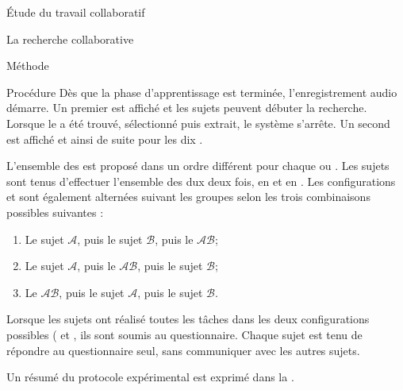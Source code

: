 \documentclass[myfrancais]{mythesis}
\begin{document}
\begin{mypart}{Étude du travail collaboratif}
\begin{mychapter}{La recherche collaborative}
\begin{mysection}{Méthode}
\begin{mysubsection}{Procédure}
					Dès que la phase d'apprentissage est terminée, l'enregistrement audio démarre.
					Un premier  est affiché et les sujets peuvent débuter la recherche.
					Lorsque le  a été trouvé, sélectionné puis extrait, le système s'arrête.
					Un second  est affiché et ainsi de suite pour les dix .

					L'ensemble des  est proposé dans un ordre différent pour chaque  ou .
					Les sujets sont tenus d'effectuer l'ensemble des dux  deux fois, en  et en .
					Les configurations  et  sont également alternées suivant les groupes selon les trois combinaisons possibles suivantes :
					\begin{enumerate}
						\item Le sujet $\mathcal{A}$, puis le sujet $\mathcal{B}$, puis le  $\mathcal{AB}$;
						\item Le sujet $\mathcal{A}$, puis le  $\mathcal{AB}$, puis le sujet $\mathcal{B}$;
						\item Le  $\mathcal{AB}$, puis le sujet $\mathcal{A}$, puis le sujet $\mathcal{B}$.
					\end{enumerate}

					Lorsque les sujets ont réalisé toutes les tâches dans les deux configurations possibles ( et , ils sont soumis au questionnaire.
					Chaque sujet est tenu de répondre au questionnaire seul, sans communiquer avec les autres sujets.

					Un résumé du protocole expérimental est exprimé dans la .


\end{mysubsection}
\end{mysection}
\end{mychapter}
\end{mypart}
\end{document}
